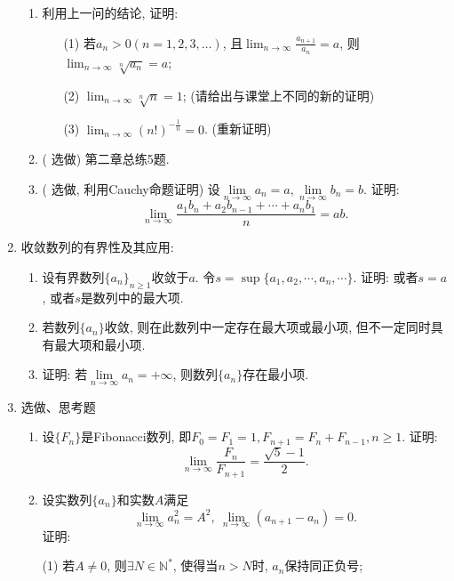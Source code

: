 \documentclass[UTF8,11pt, a4paper, oneside, fontset=none]{ctexbook}
\begin{document}
\begin{enumerate}
\begin{enumerate}
\item 利用上一问的结论, 证明:
\begin{itemize}
\item[(1)] 若$a_n>0 (n = 1, 2, 3, \ldots)$, 且$\lim_{n \to \infty}\frac{a_{n+1}}{a_n} =a$, 则$\lim_{n \to \infty} \sqrt[n]{a_n} =a$;
\item[(2)] $\lim_{n \to \infty} \sqrt[n]{n} =1$; (请给出与课堂上不同的新的证明)
\item[(3)] $\lim_{n \to \infty} (n!)^{-\frac{1}{n}} =0$. (重新证明)
\end{itemize} 

\item ({\color{red} 选做}) 第二章总练5题.

\item ({\color{red} 选做, 利用Cauchy命题证明}) 设$\lim\limits_{n \to \infty} a_n =a, \lim\limits_{n \to \infty} b_n =b$. 证明:
\[
\lim_{n \to \infty} \frac{a_1 b_n + a_2 b_{n-1} + \cdots + a_n b_1}{n} = ab. 
\]

\end{enumerate}

\item 收敛数列的有界性及其应用:

\begin{enumerate}
\item 设有界数列$\{ a_n \}_{n \geq 1}$收敛于$a$. 令$s = \sup \{a_1, a_2, \cdots, a_n, \cdots \}$. 证明: 或者$s = a$, 或者$s$是数列中的最大项.

\item 若数列$\{a_n\}$收敛, 则在此数列中一定存在最大项或最小项, 但不一定同时具有最大项和最小项.
\item 证明: 若$\lim\limits_{n \to \infty} a_n = +\infty$, 则数列$\{a_n\}$存在最小项.
\end{enumerate}

\item {\color{red} 选做、思考题}

\begin{enumerate}

\item 设$\{ F_n\}$是Fibonacci数列, 即$F_0 = F_1 =1, F_{n+1} = F_n + F_{n-1}, n \geq 1$. 证明: 
\[
\lim_{n \to \infty} \frac{F_n}{F_{n+1}} = \frac{\sqrt 5 -1}{2}.
\]

\item 设实数列$\{a_n\}$和实数$A$满足
\[
\lim_{n \to \infty} a_n^2 = A^2, \ \lim_{n \to \infty}(a_{n+1} - a_n) =0.
\]
证明: 

(1) 若$A \neq 0$, 则$\exists N \in \mathbb N^*$, 使得当$n >N$时, $a_n$保持同正负号;


\end{enumerate}
\end{enumerate}
\end{document}
